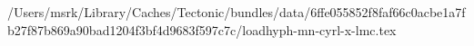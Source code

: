 /Users/msrk/Library/Caches/Tectonic/bundles/data/6ffe055852f8faf66c0acbe1a7fb27f87b869a90bad1204f3bf4d9683f597c7c/loadhyph-mn-cyrl-x-lmc.tex